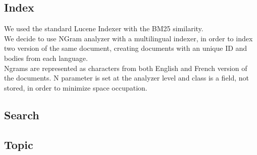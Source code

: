 \subsection{Index}\label{subsec:index}
We used the standard Lucene Indexer with the BM25\cite{BM25} similarity.\\
We decide to use NGram analyzer with a multilingual indexer,
in order to index two version of the same document, creating documents with
an unique ID and bodies from each language.\\
Ngrams are represented as characters from both English and French version of
the documents. N parameter is set at the analyzer level and class is a field,
not stored, in order to minimize space occupation.\\

\subsection{Search}\label{subsec:search}

\subsection{Topic}\label{subsec:topic}